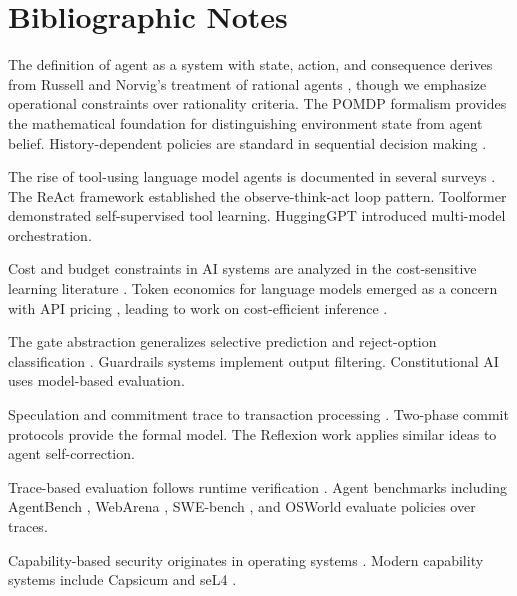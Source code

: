 \section*{Bibliographic Notes}

The definition of agent as a system with state, action, and consequence derives from Russell and Norvig's treatment of rational agents \cite{russell2010artificial}, though we emphasize operational constraints over rationality criteria. The POMDP formalism \cite{kaelbling1998planning} provides the mathematical foundation for distinguishing environment state from agent belief. History-dependent policies are standard in sequential decision making \cite{puterman1994markov}.

The rise of tool-using language model agents is documented in several surveys \cite{wang2024survey, xi2023rise, sumers2024cognitive}. The ReAct framework \cite{yao2022react} established the observe-think-act loop pattern. Toolformer \cite{schick2023toolformer} demonstrated self-supervised tool learning. HuggingGPT \cite{shen2023hugginggpt} introduced multi-model orchestration.

Cost and budget constraints in AI systems are analyzed in the cost-sensitive learning literature \cite{turney2000types, elkan2001foundations}. Token economics for language models emerged as a concern with API pricing \cite{chen2023frugalgpt}, leading to work on cost-efficient inference \cite{yue2024largelanguagemodel}.

The gate abstraction generalizes selective prediction \cite{geifman2017selective, elyaniv2010foundations} and reject-option classification \cite{chow1970optimum, bartlett2008classification}. Guardrails systems \cite{rebedea2023nemo, inan2023llama} implement output filtering. Constitutional AI \cite{bai2022constitutional} uses model-based evaluation.

Speculation and commitment trace to transaction processing \cite{gray1992transaction}. Two-phase commit protocols \cite{gray1978notes} provide the formal model. The Reflexion work \cite{shinn2023reflexion} applies similar ideas to agent self-correction.

Trace-based evaluation follows runtime verification \cite{leucker2009brief, havelund2018introduction}. Agent benchmarks including AgentBench \cite{liu2023agentbench}, WebArena \cite{zhou2024webarena}, SWE-bench \cite{jimenez2024swebench}, and OSWorld \cite{xie2024osworld} evaluate policies over traces.

Capability-based security originates in operating systems \cite{dennis1966programming, levy1984capability, saltzer1975protection}. Modern capability systems include Capsicum \cite{watson2010capsicum} and seL4 \cite{klein2009sel4}.

